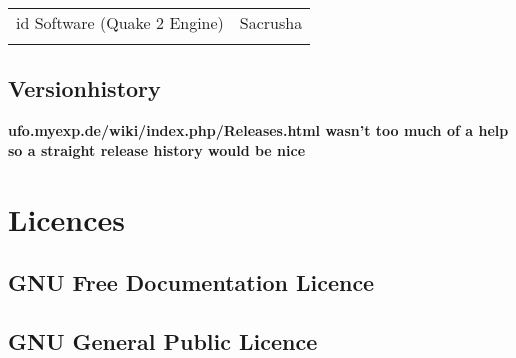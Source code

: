 \begin{tabular}{lr}
id Software (Quake 2 Engine)  & Sacrusha 					\\ 
 												&  									\\ 
\end{tabular}
\newpage

\subsection{Versionhistory}
\textbf{ufo.myexp.de/wiki/index.php/Releases.html wasn't too much of a help so a straight release history would be nice}

\section{Licences}
\subsection{GNU Free Documentation Licence}
\subsection{GNU General Public Licence}
